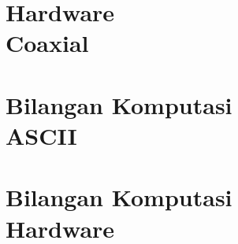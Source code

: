 \documentclass{WileySix}
\begin{document}
\chapter[Coaxial]
{Hardware\\ Coaxial}


%

\chapter[Bilangan Komputasi ASCII]
{Bilangan Komputasi\\ ASCII}


%

\chapter[Cara kerja hardware]
{Bilangan Komputasi\\ Hardware}


%





\printindex
\end{document}
